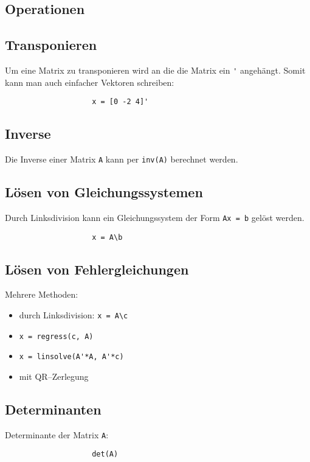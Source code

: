 \documentclass[10pt]{article}
\begin{document}
\begin{multicols*}{3}
		\section*{Operationen} %
			\subsection*{Transponieren} %
				Um eine Matrix zu transponieren wird an die die Matrix ein \verb+'+ angehängt.
				Somit kann man auch einfacher Vektoren schreiben:
				\begin{verbatim}
					x = [0 -2 4]'
				\end{verbatim}
			\subsection*{Inverse} %
				Die Inverse einer Matrix \verb+A+ kann per \verb+inv(A)+ berechnet werden.
			\subsection*{Lösen von Gleichungssystemen} %
				Durch Linksdivision kann ein Gleichungssystem der Form \verb+Ax = b+ gelöst werden.
				\begin{verbatim}
					x = A\b
				\end{verbatim}
			\subsection*{Lösen von Fehlergleichungen} %
				Mehrere Methoden:
				\begin{itemize}
					\item durch Linksdivision: \verb+x = A\c+
					\item \verb+x = regress(c, A)+
					\item \verb+x = linsolve(A'*A, A'*c)+
					\item mit QR--Zerlegung
				\end{itemize}
			\subsection*{Determinanten} %
				Determinante der Matrix \verb+A+:
				\begin{verbatim}
					det(A)
				\end{verbatim}

\end{multicols*}
\end{document}
